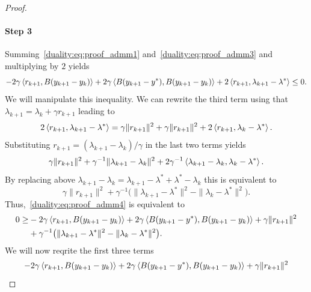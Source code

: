 \begin{proof}
    \paragraph{Step 3}
    Summing~\eqref{duality:eq:proof_admm1} and~\eqref{duality:eq:proof_admm3} and multiplying by $2$ yields
    \begin{equation}\label{duality:eq:proof_admm4}
        -2\gamma \left\langle r_{k+1} , B(y_{k+1}-y_k)\right\rangle + 2\gamma\left\langle B(y_{k+1}-y^*) , B(y_{k+1}-y_k)\right\rangle + 2\left\langle r_{k+1} , \lambda_{k+1}-\lambda^*\right\rangle\leq 0.
    \end{equation}
    We will manipulate this inequality. We can rewrite the third term using that $\lambda_{k+1} = \lambda_k + \gamma r_{k+1}$ leading to 
    \begin{equation}
        2\left\langle r_{k+1} , \lambda_{k+1}-\lambda^*\right\rangle
        = \gamma\|r_{k+1}\|^2 + \gamma\|r_{k+1}\|^2 + 2\left\langle r_{k+1} , \lambda_k -\lambda^*\right\rangle.
    \end{equation}
    Substituting $r_{k+1} = (\lambda_{k+1}-\lambda_k)/\gamma$ in the last two terms yields
    \begin{equation}
        \gamma\|r_{k+1}\|^2 + \gamma^{-1}\|\lambda_{k+1}-\lambda_k\|^2 + 2\gamma^{-1}\left\langle\lambda_{k+1}-\lambda_k , \lambda_k -\lambda^*\right\rangle.
    \end{equation}
    By replacing above $\lambda_{k+1}-\lambda_k = \lambda_{k+1}-\lambda^* + \lambda^* - \lambda_k$ this is equivalent to
    \begin{equation}
        \gamma\|r_{k+1}\|^2 + \gamma^{-1}\big(\|\lambda_{k+1}-\lambda^*\|^2 - \|\lambda_{k}-\lambda^*\|^2\big).
    \end{equation}
    Thus,~\eqref{duality:eq:proof_admm4} is equivalent to 
    \begin{equation}\label{duality:eq:proof_admm5}
        \begin{aligned}
            0\geq&-2\gamma \left\langle r_{k+1} , B(y_{k+1}-y_k)\right\rangle + 2\gamma\left\langle B(y_{k+1}-y^*) , B(y_{k+1}-y_k)\right\rangle + \gamma\|r_{k+1}\|^2 \\
            &+ \gamma^{-1}\big(\|\lambda_{k+1}-\lambda^*\|^2 - \|\lambda_{k}-\lambda^*\|^2\big).
        \end{aligned}
    \end{equation}
    We will now reqrite the first three terms 
    \begin{equation}\label{duality:eq:proof_admm6}
        -2\gamma \left\langle r_{k+1} , B(y_{k+1}-y_k)\right\rangle + 2\gamma\left\langle B(y_{k+1}-y^*) , B(y_{k+1}-y_k)\right\rangle + \gamma\|r_{k+1}\|^2
    \end{equation}

\end{proof}
